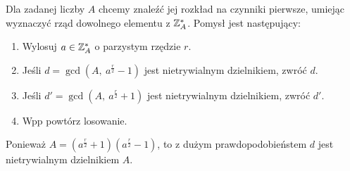 Dla zadanej liczby \( A \) chcemy znaleźć jej rozkład na czynniki pierwsze, umiejąc wyznaczyć rząd dowolnego elementu z \( \mathbb{Z}_A^* \).
Pomysł jest następujący:
\begin{greyframe}
	\begin{enumerate}
		\item Wylosuj \( a \in \mathbb{Z}_A^* \) o parzystym rzędzie \( r \).
		\item Jeśli \( d = \gcd(A, \ a^{\frac{r}{2}} - 1) \) jest nietrywialnym dzielnikiem, zwróć \(d\).
		\item Jeśli \( d' = \gcd(A, \ a^{\frac{r}{2}} + 1) \) jest nietrywialnym dzielnikiem, zwróć \(d'\).
		\item Wpp powtórz losowanie.
	\end{enumerate}
\end{greyframe}
Ponieważ \( A = (a^{\frac{r}{2}} + 1) (a^{\frac{r}{2}} - 1) \), to z dużym prawdopodobieństem \( d \) jest nietrywialnym dzielnikiem \( A \).

